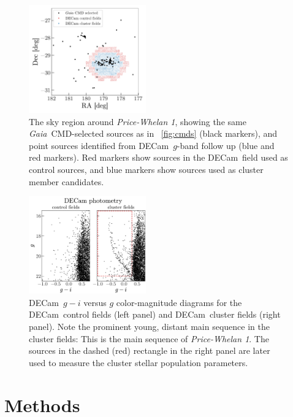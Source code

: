\documentclass[twocolumn]{aastex62}
\newcommand{\gaia}{\textsl{Gaia}}
\newcommand{\decam}{DECam}
\newcommand{\clustername}{\textsl{Price-Whelan 1}}
\begin{document}
 \begin{figure}
 \centering
 \includegraphics[width=0.45\textwidth]{figures/DECam-field.pdf}
 \caption{The sky region around \clustername, showing the same \gaia\ CMD-selected sources as in \figurename~\ref{fig:cmds} (black markers), and point sources identified from \decam\ $g$-band follow up (blue and red markers).
 Red markers show sources in the \decam\ field used as control sources, and blue markers show sources used as cluster member candidates.}
 \label{fig:decam-field}
 \end{figure}

\begin{figure}
\centering
\includegraphics[width=0.45\textwidth]{figures/DECam-cmd.pdf}
\caption{\decam\ $g-i$ versus $g$ color-magnitude diagrams for the \decam\ control fields (left panel) and \decam\ cluster fields (right panel).
Note the prominent young, distant main sequence in the cluster fields: This is the main sequence of \clustername.
The sources in the dashed (red) rectangle in the right panel are later used to measure the cluster stellar population parameters.
}
\label{fig:decam-cmd}
\end{figure}


\section{Methods} \label{sec:methods}
\end{document}
